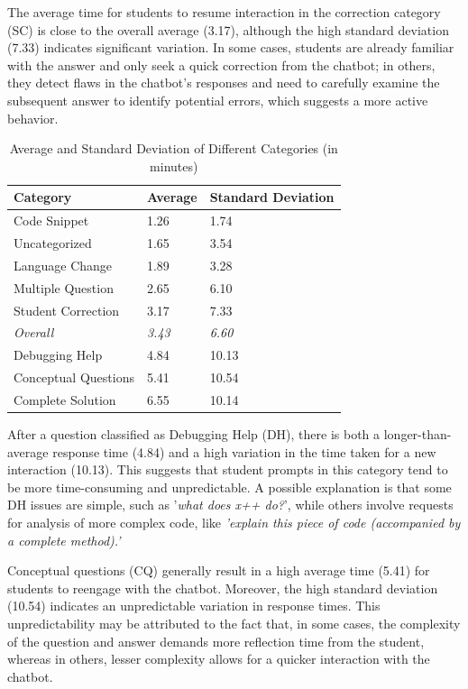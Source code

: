 \documentclass[runningheads]{llncs}
\begin{document}
The average time for students to resume interaction in the correction category
(SC) is close to the overall average (3.17), although the high standard
deviation (7.33) indicates significant variation. In some cases, students are
already familiar with the answer and only seek a quick correction from the chatbot;
in others, they detect flaws in the chatbot's responses and need to carefully
examine the subsequent answer to identify potential errors, which suggests a
more active behavior.

\begin{table}[htbp]
\caption{Average and Standard Deviation of Different Categories (in minutes)}
\centering
\renewcommand{\arraystretch}{1.2} %
    \begin{tabular}{|p{4cm}|p{4cm}|p{4cm}|} %
        \hline
        \textbf{Category} & \textbf{Average} & \textbf{Standard Deviation} \\
        \hline
        Code Snippet & 1.26 & 1.74 \\
        Uncategorized & 1.65 & 3.54 \\
        Language Change & 1.89 & 3.28 \\
        Multiple Question & 2.65 & 6.10 \\
        Student Correction & 3.17 & 7.33 \\
        \hdashline
        \textit{Overall} & \textit{3.43} & \textit{6.60} \\
        \hdashline
        Debugging Help & 4.84 & 10.13 \\
        Conceptual Questions & 5.41 & 10.54 \\
        Complete Solution & 6.55 & 10.14 \\
        \hline
    \end{tabular}
\label{tab:averages}
\end{table}

After a question classified as Debugging Help (DH), there is both a
longer-than-average response time (4.84) and a high variation in the time taken
for a new interaction (10.13). This suggests that student prompts in this
category tend to be more time-consuming and unpredictable. A possible
explanation is that some DH issues are simple, such as '\textit{what does x++ do?}',
while others involve requests for analysis of more complex code, like
\textit{'explain this piece of code (accompanied by a complete method).'}

Conceptual questions (CQ) generally result in a high average time (5.41) for
students to reengage with the chatbot. Moreover, the high standard deviation
(10.54) indicates an unpredictable variation in response times. This
unpredictability may be attributed to the fact that, in some cases, the
complexity of the question and answer demands more reflection time from the
student, whereas in others, lesser complexity allows for a quicker interaction
with the chatbot.
\end{document}
